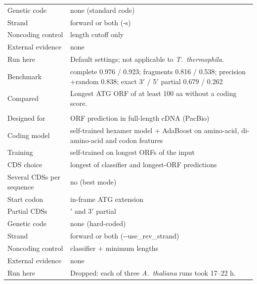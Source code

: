\begin{longtable}{@{}>{\raggedright}p{3.2cm}>{\raggedright\arraybackslash}p{12.3cm}@{}}
Genetic code & none (standard code) \\*
Strand & forward or both (-s) \\*
Noncoding control & length cutoff only \\*
External evidence & none \\*
Run here & Default settings; not applicable to \textit{T.~thermophila}. \\*
Benchmark & complete 0.976 / 0.923; fragments 0.816 / 0.538; precision +random 0.838; exact 3$'$ / 5$'$ partial 0.679 / 0.262 \\*
Compared & Longest ATG ORF of at least 100 aa without a coding score. \\
\addlinespace[6pt]
\multicolumn{2}{@{}l}{\textbf{ANGEL} \citep{Shimizu2006} (3.0; not benchmarked)} \\*
Designed for & ORF prediction in full-length cDNA (PacBio) \\*
Coding model & self-trained hexamer model + AdaBoost on amino-acid, di-amino-acid and codon features \\*
Training & self-trained on longest ORFs of the input \\*
CDS choice & longest of classifier and longest-ORF predictions \\*
Several CDSs per sequence & no (best mode) \\*
Start codon & in-frame ATG extension \\*
Partial CDSs & 5$'$ and 3$'$ partial \\*
Genetic code & none (hard-coded) \\*
Strand & forward or both (-{}-use\_rev\_strand) \\*
Noncoding control & classifier + minimum lengths \\*
External evidence & none \\*
Run here & Dropped: each of three \textit{A.~thaliana} runs took 17--22 h. \\
\end{longtable}
